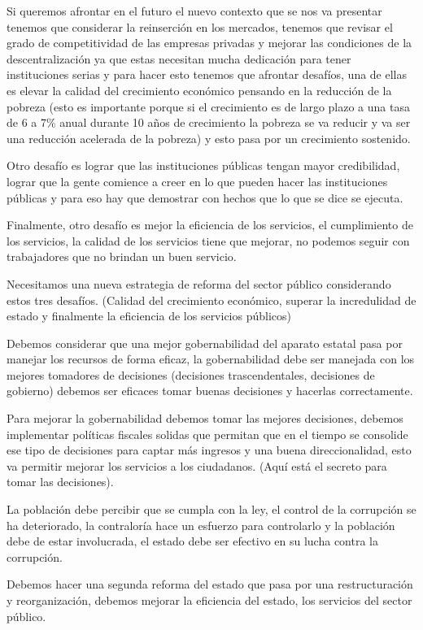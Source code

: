\documentclass[
  jou,
  floatsintext,
  longtable,
  a4paper,
  nolmodern,
  notxfonts,
  notimes,
  12pt,
  colorlinks=true,linkcolor=blue,citecolor=blue,urlcolor=blue]{apa7}
\begin{document}
Si queremos afrontar en el futuro el nuevo contexto que se nos va
presentar tenemos que considerar la reinserción en los mercados, tenemos
que revisar el grado de competitividad de las empresas privadas y
mejorar las condiciones de la descentralización ya que estas necesitan
mucha dedicación para tener instituciones serias y para hacer esto
tenemos que afrontar desafíos, una de ellas es elevar la calidad del
crecimiento económico pensando en la reducción de la pobreza (esto es
importante porque si el crecimiento es de largo plazo a una tasa de 6 a
7\% anual durante 10 años de crecimiento la pobreza se va reducir y va
ser una reducción acelerada de la pobreza) y esto pasa por un
crecimiento sostenido.

Otro desafío es lograr que las instituciones públicas tengan mayor
credibilidad, lograr que la gente comience a creer en lo que pueden
hacer las instituciones públicas y para eso hay que demostrar con hechos
que lo que se dice se ejecuta.

Finalmente, otro desafío es mejor la eficiencia de los servicios, el
cumplimiento de los servicios, la calidad de los servicios tiene que
mejorar, no podemos seguir con trabajadores que no brindan un buen
servicio.

Necesitamos una nueva estrategia de reforma del sector público
considerando estos tres desafíos. (Calidad del crecimiento económico,
superar la incredulidad de estado y finalmente la eficiencia de los
servicios públicos)

Debemos considerar que una mejor gobernabilidad del aparato estatal pasa
por manejar los recursos de forma eficaz, la gobernabilidad debe ser
manejada con los mejores tomadores de decisiones (decisiones
trascendentales, decisiones de gobierno) debemos ser eficaces tomar
buenas decisiones y hacerlas correctamente.

Para mejorar la gobernabilidad debemos tomar las mejores decisiones,
debemos implementar políticas fiscales solidas que permitan que en el
tiempo se consolide ese tipo de decisiones para captar más ingresos y
una buena direccionalidad, esto va permitir mejorar los servicios a los
ciudadanos. (Aquí está el secreto para tomar las decisiones).

La población debe percibir que se cumpla con la ley, el control de la
corrupción se ha deteriorado, la contraloría hace un esfuerzo para
controlarlo y la población debe de estar involucrada, el estado debe ser
efectivo en su lucha contra la corrupción.

Debemos hacer una segunda reforma del estado que pasa por una
restructuración y reorganización, debemos mejorar la eficiencia del
estado, los servicios del sector público.
\end{document}
